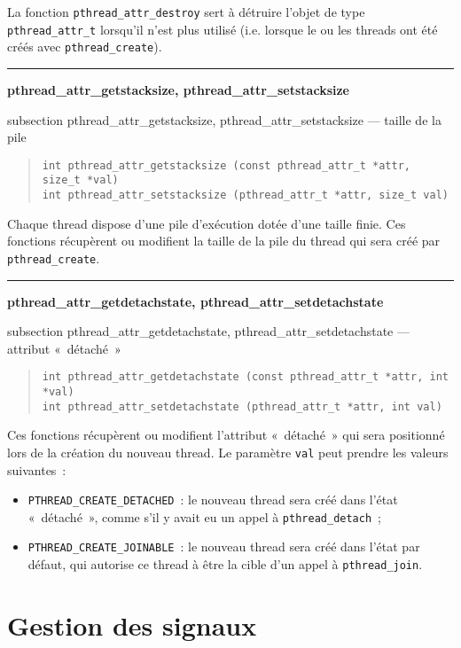 \documentclass [twoside] {report}
\newcommand {\primitive} [1]
    {
	{\large \bf #1}
	\addcontentsline {toc} {subsection} {#1}
    }
\newcommand {\separation}
    {
	\vspace {7mm}
	\nopagebreak
	\hrule
    }
\begin{document}
La fonction \verb|pthread_attr_destroy| sert à détruire l'objet de type
\verb|pthread_attr_t| lorsqu'il n'est plus utilisé (i.e.  lorsque le
ou les threads ont été créés avec \verb|pthread_create|).


\separation
\primitive {pthread\_attr\_getstacksize, pthread\_attr\_setstacksize} --- taille de la pile

\begin {quote}
\begin {verbatim}
int pthread_attr_getstacksize (const pthread_attr_t *attr, size_t *val)
int pthread_attr_setstacksize (pthread_attr_t *attr, size_t val)
\end{verbatim}
\end {quote}

Chaque thread dispose d'une pile d'exécution dotée d'une taille
finie. Ces fonctions récupèrent ou modifient la taille de la pile
du thread qui sera créé par \verb|pthread_create|.


\separation
\primitive {pthread\_attr\_getdetachstate,
pthread\_attr\_setdetachstate} --- attribut «~détaché~»

\begin {quote}
\begin {verbatim}
int pthread_attr_getdetachstate (const pthread_attr_t *attr, int *val)
int pthread_attr_setdetachstate (pthread_attr_t *attr, int val)
\end{verbatim}
\end {quote}

Ces fonctions récupèrent ou modifient l'attribut «~détaché~» qui
sera positionné lors de la création du nouveau thread. Le paramètre
\texttt {val} peut prendre les valeurs suivantes~:

\begin {itemize}
    \item \verb|PTHREAD_CREATE_DETACHED|~: le nouveau thread sera
	créé dans l'état «~détaché~», comme s'il y avait eu un appel
	à \verb|pthread_detach|~;
    \item \verb|PTHREAD_CREATE_JOINABLE|~: le nouveau thread sera
	créé dans l'état par défaut, qui autorise ce thread à être
	la cible d'un appel à \verb|pthread_join|.
\end {itemize}


\section {Gestion des signaux}
\end{document}
